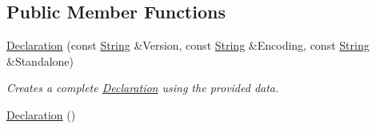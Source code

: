 \subsection*{Public Member Functions}
\begin{DoxyCompactItemize}
\item 
\hyperlink{classphys_1_1xml_1_1Declaration_a421ed43649167d1bb2c40d454d7be2d2}{Declaration} (const \hyperlink{namespacephys_aa03900411993de7fbfec4789bc1d392e}{String} \&Version, const \hyperlink{namespacephys_aa03900411993de7fbfec4789bc1d392e}{String} \&Encoding, const \hyperlink{namespacephys_aa03900411993de7fbfec4789bc1d392e}{String} \&Standalone)
\begin{DoxyCompactList}\small\item\em Creates a complete \hyperlink{classphys_1_1xml_1_1Declaration}{Declaration} using the provided data. \item\end{DoxyCompactList}\item 
\hypertarget{classphys_1_1xml_1_1Declaration_a8708aae8a6c6e170936481d2e402419f}{
\hyperlink{classphys_1_1xml_1_1Declaration_a8708aae8a6c6e170936481d2e402419f}{Declaration} ()}
\label{d7/d50/classphys_1_1xml_1_1Declaration_a8708aae8a6c6e170936481d2e402419f}


\end{DoxyCompactItemize}
